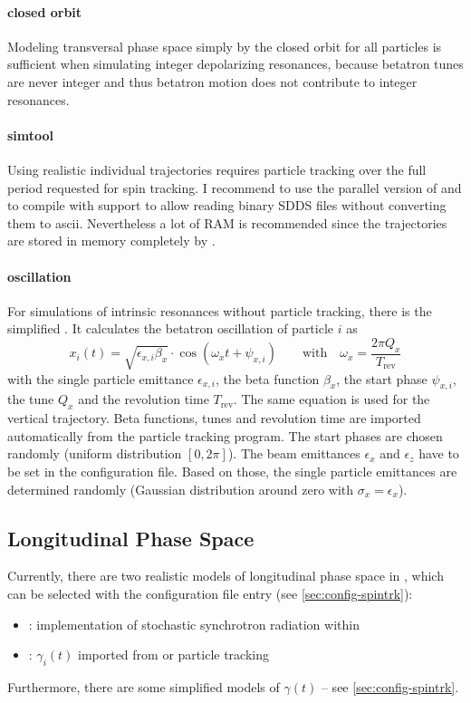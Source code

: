 \documentclass[a4paper]{scrartcl}
\begin{document}
\paragraph{closed orbit}
Modeling transversal phase space simply by the closed orbit for all particles is
sufficient when simulating integer depolarizing resonances, because betatron tunes are
never integer and thus betatron motion does not contribute to integer resonances.

\paragraph{simtool}
Using realistic individual trajectories requires particle tracking over the full period
requested for spin tracking. I recommend to use the parallel version of \ele and to
compile \pal with  support to allow \pal reading binary SDDS files without
converting them to ascii. Nevertheless a lot of RAM is recommended since the trajectories
are stored in memory completely by .

\paragraph{oscillation}
For simulations of intrinsic resonances without particle tracking, there is the simplified
 . It calculates the betatron
oscillation of particle $i$ as
\begin{equation}
  \label{eq:traj-oscillation}
  x_i(t) = \sqrt{\epsilon_{x,i} \beta_x} \cdot \cos\left(\omega_xt + \psi_{x,i}\right)
  \qquad\text{with}\quad
  \omega_x = \frac{2\pi Q_x}{T_\text{rev}}
\end{equation}
with the single particle emittance $\epsilon_{x,i}$, the beta function $\beta_x$, the
start phase $\psi_{x,i}$, the tune $Q_x$ and the revolution time $T_\text{rev}$. The same
equation is used for the vertical trajectory.
%
Beta functions, tunes and revolution time are imported automatically from the particle tracking
program. The start phases are chosen randomly (uniform distribution $[0,2\pi]$). The
beam emittances $\epsilon_x$ and $\epsilon_z$ have to be set in the configuration file.
Based on those, the single particle emittances are determined randomly (Gaussian
distribution around zero with $\sigma_x=\epsilon_x$).


\subsection{Longitudinal Phase Space}
\label{sec:concept-gamma}
Currently, there are two realistic models of longitudinal phase space in \polem, which can
be selected with the configuration file entry  (see
\cref{sec:config-spintrk}):
\begin{itemize}
\item {}: implementation of stochastic synchrotron radiation within \polem
\item {}: $\gamma_i(t)$ imported from \ele or \madx particle tracking
\end{itemize}
Furthermore, there are some simplified models of $\gamma(t)$ -- see
\cref{sec:config-spintrk}.
\end{document}
